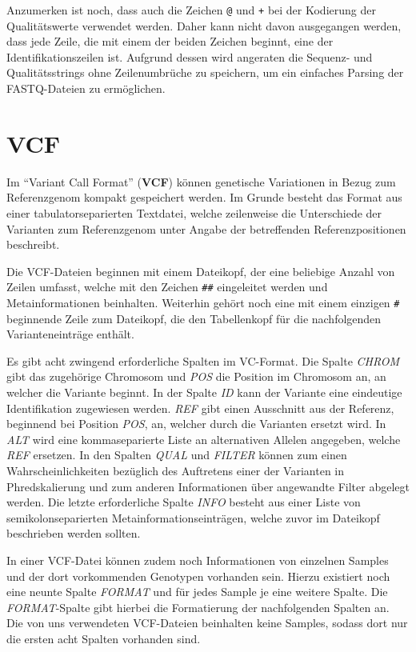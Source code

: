 Anzumerken ist noch, dass auch die Zeichen \texttt{@} und \texttt{+} bei der Kodierung der Qualitätswerte verwendet werden.
Daher kann nicht davon ausgegangen werden, dass jede Zeile, die mit einem der beiden Zeichen beginnt, eine der Identifikationszeilen ist.
Aufgrund dessen wird angeraten die Sequenz- und Qualitätsstrings ohne Zeilenumbrüche zu speichern, um ein einfaches Parsing der FASTQ-Dateien zu ermöglichen.

\section{VCF}
\label{sec:data:vcf}
Im "`Variant Call Format"' (\textbf{VCF}) können genetische Variationen in Bezug zum Referenzgenom kompakt gespeichert werden\citep{Danecek2011}.
Im Grunde besteht das Format aus einer tabulatorseparierten Textdatei, welche zeilenweise die Unterschiede der Varianten zum Referenzgenom unter Angabe der betreffenden Referenzpositionen beschreibt.

Die VCF-Dateien beginnen mit einem Dateikopf, der eine beliebige Anzahl von Zeilen umfasst, welche mit den Zeichen \texttt{\#\#} eingeleitet werden und Metainformationen beinhalten.
Weiterhin gehört noch eine mit einem einzigen \texttt{\#} beginnende Zeile zum Dateikopf, die den Tabellenkopf für die nachfolgenden Varianteneinträge enthält.

Es gibt acht zwingend erforderliche Spalten im VC-Format.
Die Spalte \emph{CHROM} gibt das zugehörige Chromosom und \emph{POS} die Position im Chromosom an, an welcher die Variante beginnt.
In der Spalte \emph{ID} kann der Variante eine eindeutige Identifikation zugewiesen werden.
\emph{REF} gibt einen Ausschnitt aus der Referenz, beginnend bei Position \emph{POS}, an, welcher durch die Varianten ersetzt wird.
In \emph{ALT} wird eine kommaseparierte Liste an alternativen Allelen angegeben, welche \emph{REF} ersetzen.
In den Spalten \emph{QUAL} und \emph{FILTER} können zum einen Wahrscheinlichkeiten bezüglich des Auftretens einer der Varianten in Phredskalierung und zum anderen Informationen über angewandte Filter abgelegt werden.
Die letzte erforderliche Spalte \emph{INFO} besteht aus einer Liste von semikolonseparierten Metainformationseinträgen, welche zuvor im Dateikopf beschrieben werden sollten.

In einer VCF-Datei können zudem noch Informationen von einzelnen Samples und der dort vorkommenden Genotypen vorhanden sein.
Hierzu existiert noch eine neunte Spalte \emph{FORMAT} und für jedes Sample je eine weitere Spalte.
Die \emph{FORMAT}-Spalte gibt hierbei die Formatierung der nachfolgenden Spalten an.
Die von uns verwendeten VCF-Dateien beinhalten keine Samples, sodass dort nur die ersten acht Spalten vorhanden sind.

